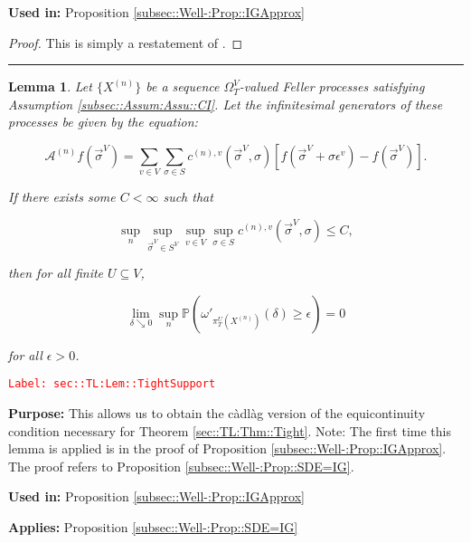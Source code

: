 \documentclass[12pt]{article}
\newcommand{\mb}{\mathbb}
\newcommand{\mc}{\mathcal}
\newcommand{\ep}{\epsilon}
\newcommand{\tr}{\textcolor{red}}
\newcommand{\labe}[1]{\tr{\texttt{Label: #1}}}
\newcommand{\purpose}{\textbf{Purpose: }}
\newcommand{\usein}{\textbf{Used in: }}
\newcommand{\app}{\textbf{Applies: }}
\newcommand{\lin}{\rule{\linewidth}{0.4 pt}}
\newcommand{\pr}{\mb{P}}							%
\renewcommand{\v}{v}							%
\renewcommand{\U}{U}							%
\renewcommand{\S}{S}							%
\newcommand{\s}{\sigma}							%
\newcommand{\sv}{\vec{\s}}						%
\newcommand{\ev}{\ep}							%
\newcommand{\T}{T}								%
\newcommand{\sset}{\Omega}						%
\newcommand{\proj}{\pi}							%
\newcommand{\X}{X}								%
\newcommand{\IG}{\mc{A}}						%
\newcommand{\IGr}{c}							%
\newcommand{\vind}[1]{^{#1}}					%
\newcommand{\carp}[1]{^{#1}}					%
\newcommand{\vsi}[1]{^{#1}}						%
\newcommand{\ts}[1]{_{#1}}						%
\newcommand{\slnvind}[2]{^{(#1),#2}}				%
\newcommand{\const}{C}							%
\newcommand{\sln}[1]{^{(#1)}}					%
\newcommand{\cmodu}{\omega'}					%
\newcommand{\pra}[1]{_{#1}}						%
\newtheorem{lem}[thms]{Lemma}
\begin{document}
\usein Proposition \ref{subsec::Well-:Prop::IGApprox}

\begin{proof}
This is simply a restatement of \cite[Theorem 13.2]{Bil99}.
\end{proof}

\lin

\begin{lem}
Let \(\{\X\sln{n}\}\) be a sequence \(\sset\vsi{V}\ts{\T}\)-valued Feller processes satisfying Assumption \ref{subsec::Assum:Assu::CI}. Let the infinitesimal generators of these processes be given by the equation:

\[\IG\sln{n}f(\sv\vsi{V}) = \sum_{\v\in V}\sum_{\s \in \S} \IGr\slnvind{n}{\v}(\sv\vsi{V},\s)[f(\sv\vsi{V} + \s\ev\vind{\v}) - f(\sv\vsi{V})].\]

If there exists some \(\const < \infty\) such that

\[\sup_{n}\sup_{\sv\vsi{V}\in \S\carp{V}}\sup_{\v\in V}\sup_{\s\in \S} \IGr\slnvind{n}{\v}(\sv\vsi{V},\s) \leq \const,\]

then for all finite \(\U \subseteq V\),

\[\lim_{\delta \searrow 0} \sup_n \pr\left(\cmodu\pra{\proj\vsi{\U}\ts{\T}\left(\X\sln{n}\right)}(\delta) \geq \ep\right) = 0\]

for all \(\ep > 0\).
\label{sec::TL:Lem::TightSupport}
\end{lem}
\labe{sec::TL:Lem::TightSupport}

\purpose This allows us to obtain the c\`adl\`ag version of the equicontinuity condition necessary for Theorem \ref{sec::TL:Thm::Tight}. Note: The first time this lemma is applied is in the proof of Proposition \ref{subsec::Well-:Prop::IGApprox}. The proof refers to Proposition \ref{subsec::Well-:Prop::SDE=IG}.

\usein Proposition \ref{subsec::Well-:Prop::IGApprox}

\app Proposition \ref{subsec::Well-:Prop::SDE=IG}
\end{document}
